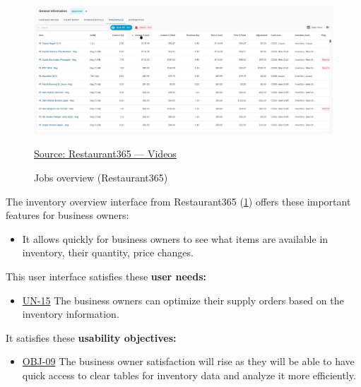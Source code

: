 \documentclass[]{VUMIFTemplateClass}
\begin{document}




\begin{figure}[H]
    \centering
    \includegraphics[width=\textwidth]{images/examples/inventory_r365.png}
    \caption{Jobs overview (Restaurant365)}
    \href{https://www.restaurant365.com/resource-category/videos/}{Source: Restaurant365 — Videos}
    \label{fig:inventory-overview}
\end{figure}

The inventory overview interface from Restaurant365 (\ref{fig:inventory-overview}) offers these important features for business owners:

\begin{itemize}
    \item It allows quickly for business owners to see what items are available in inventory, their quantity, price changes.
\end{itemize}

This user interface satisfies these \textbf{user needs:}

\begin{itemize}
    \item \hyperref[UN-15]{UN-15} The business owners can optimize their supply orders based on the inventory information.
\end{itemize}

It satisfies these \textbf{usability objectives:}

\begin{itemize}
    \item \hyperref[OBJ-09]{OBJ-09} The business owner satisfaction will rise as they will be able to have quick access to clear tables for inventory data and analyze it more efficiently.
\end{itemize}
\end{document}
